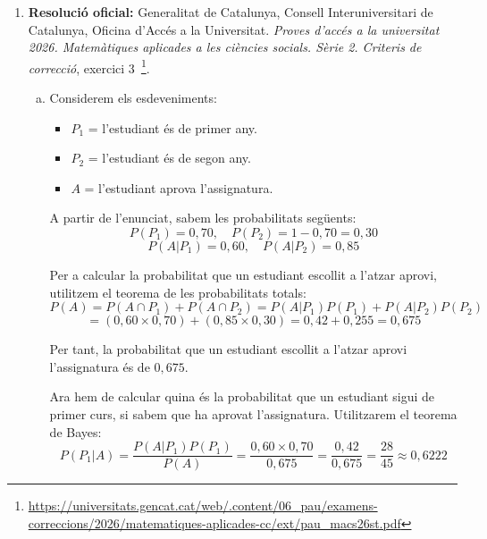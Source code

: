 \begin{enumerate}
\begin{enumerate}[a)]
 en què, si $Z$ segueix una distribució normal $(0,1)$, $P(-z_{\gamma}\leq Z\leq z_{\gamma})=\gamma$. Per tant tenim que els extrems de l'interval són

 $$\hat{p}-z_{\gamma}\sqrt{\frac{\hat{p}(1-\hat{p})}{n}}=0{,}6229-1{,}96\sqrt{\frac{0{,}6229(1-0{,}6229)}{350}}=0{,}5721$$

 i

 $$\hat{p}+z_{\gamma}\sqrt{\frac{\hat{p}(1-\hat{p})}{n}}=0{,}6229+1{,}96\sqrt{\frac{0{,}6229(1-0{,}6229)}{350}}=0{,}6737.$$

 L'interval de confiança demanat és $[57{,}21\,\%;\ 67{,}37\,\%]$, és a dir, el percentatge de persones que està a favor de la proposta està entre el $57{,}21\,\%$ i el $67{,}37\,\%$ amb una confiança del $95\,\%$.
\end{enumerate}

\item \textbf{Resolució oficial:} Generalitat de Catalunya, Consell Interuniversitari de Catalunya, Oficina d'Accés a la Universitat. \textit{Proves d'accés a la universitat 2026. Matemàtiques aplicades a les ciències socials. Sèrie 2. Criteris de correcció}, exercici 3~\footnote{\url{https://universitats.gencat.cat/web/.content/06_pau/examens-correccions/2026/matematiques-aplicades-cc/ext/pau_macs26st.pdf}}.

\begin{enumerate}[a)]
 \item Considerem els esdeveniments:
 \begin{itemize}
  \item[] $P_1$ = l'estudiant és de primer any.
  \item[] $P_2$ = l'estudiant és de segon any.
  \item[] $A$ = l'estudiant aprova l'assignatura.
 \end{itemize}

 A partir de l'enunciat, sabem les probabilitats següents:
 $$P(P_1)=0{,}70,\quad P(P_2)=1-0{,}70=0{,}30$$
 $$P(A|P_1)=0{,}60,\quad P(A|P_2)=0{,}85$$

 Per a calcular la probabilitat que un estudiant escollit a l'atzar aprovi, utilitzem el teorema de les probabilitats totals:
 $$P(A)=P(A\cap P_1)+P(A\cap P_2)=P(A|P_1)P(P_1)+P(A|P_2)P(P_2)$$
 $$=(0{,}60\times0{,}70)+(0{,}85\times0{,}30)=0{,}42+0{,}255=0{,}675$$

 Per tant, la probabilitat que un estudiant escollit a l'atzar aprovi l'assignatura és de $0{,}675$.


 Ara hem de calcular quina és la probabilitat que un estudiant sigui de primer curs, si sabem que ha aprovat l'assignatura. Utilitzarem el teorema de Bayes:
 $$P(P_1|A)=\frac{P(A|P_1)P(P_1)}{P(A)}=\frac{0{,}60\times0{,}70}{0{,}675}=\frac{0{,}42}{0{,}675}=\frac{28}{45}\approx0{,}6222$$


\end{enumerate}
\end{enumerate}
